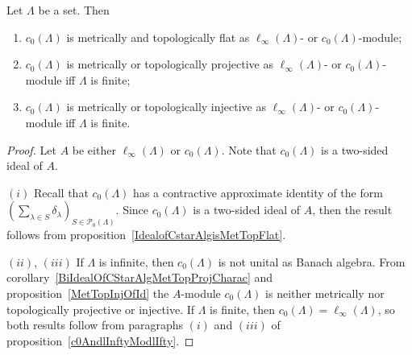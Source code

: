 \begin{proposition}\label{c0AndlInftyModc0} Let $\Lambda$ be a set. Then 

\begin{enumerate}[label = (\roman*)]
    \item $c_0(\Lambda)$ is metrically and topologically flat as
    $\ell_\infty(\Lambda)$- or $c_0(\Lambda)$-module;

    \item $c_0(\Lambda)$ is metrically or topologically projective as
    $\ell_\infty(\Lambda)$- or $c_0(\Lambda)$-module iff $\Lambda$ is finite;

    \item $c_0(\Lambda)$ is metrically or topologically injective as
    $\ell_\infty(\Lambda)$- or $c_0(\Lambda)$-module iff $\Lambda$ is finite.
\end{enumerate}
\end{proposition}
\begin{proof} Let $A$ be either $\ell_\infty(\Lambda)$ or $c_0(\Lambda)$. Note
that $c_0(\Lambda)$ is a two-sided ideal of $A$. 

$(i)$ Recall that $c_0(\Lambda)$ has a contractive approximate identity of the
form ${(\sum_{\lambda\in S}\delta_\lambda)}_{S\in\mathcal{P}_0(\Lambda)}$. Since
$c_0(\Lambda)$ is a two-sided ideal of $A$, then the result follows from
proposition~\ref{IdealofCstarAlgisMetTopFlat}.

$(ii)$, $(iii)$ If $\Lambda$ is infinite, then $c_0(\Lambda)$ is not unital as
Banach algebra. From corollary~\ref{BiIdealOfCStarAlgMetTopProjCharac} and
proposition~\ref{MetTopInjOfId} the $A$-module $c_0(\Lambda)$ is neither
metrically nor topologically projective or injective. If $\Lambda$ is finite,
then $c_0(\Lambda)=\ell_\infty(\Lambda)$, so both results follow from paragraphs
$(i)$ and $(iii)$ of proposition~\ref{c0AndlInftyModlIfty}.
\end{proof}

